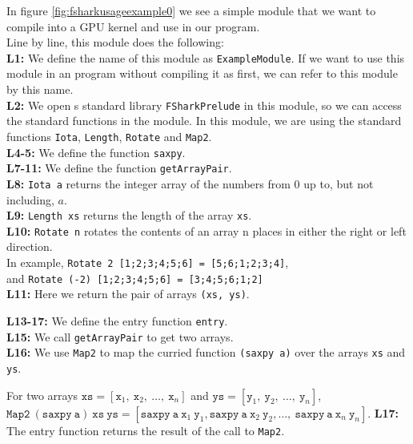 In figure \ref{fig:fsharkusageexample0} we see a simple \fshark{} module that we
want to compile into a GPU kernel and use in our \fsharp{} program.
\\
Line by line, this module does the following:\\
\textbf{L1:} We define the name of this module as \texttt{ExampleModule}. If we
want to use this module in an \fsharp{} program without compiling it as
\fshark{} first, we can refer to this module by this name.
\\
\textbf{L2:} We open \fshark{}s standard library \texttt{FSharkPrelude} in this
module, so we can access the standard functions in the \fshark{} module.
In this module, we are using the standard functions \texttt{Iota}, \texttt{Length}, \texttt{Rotate} and \texttt{Map2}.
\\
\textbf{L4-5:} We define the function \texttt{saxpy}.
\\
\textbf{L7-11:} We define the function \texttt{getArrayPair}.
\\
\textbf{L8:} \texttt{Iota a} returns the integer array of the numbers from $0$
up to, but not including, $a$.
\\
\textbf{L9:} \texttt{Length xs} returns the length of the array \texttt{xs}.
\\
\textbf{L10:} \texttt{Rotate n} rotates the contents of an array n places in
either the right or left direction.\\
In example, \texttt{Rotate 2 [1;2;3;4;5;6] = [5;6;1;2;3;4]},\\
and \texttt{Rotate (-2) [1;2;3;4;5;6] = [3;4;5;6;1;2]}
\\
\textbf{L11:} Here we return the pair of arrays \texttt{(xs, ys)}.

\textbf{L13-17:} We define the entry function \texttt{entry}.\\
\textbf{L15:} We call \texttt{getArrayPair} to get two arrays.\\
\textbf{L16:} We use \texttt{Map2} to map the curried function \texttt{(saxpy
  a)}
over the arrays \texttt{xs} and \texttt{ys}.

For two arrays $\mathtt{xs} =
[\mathtt{x}_1,~\mathtt{x}_2,~\ldots,~\mathtt{x}_n]$ and $\mathtt{ys} =
[\mathtt{y}_1,~\mathtt{y}_2,~\ldots,~\mathtt{y}_n]$,\\
$\mathtt{Map2}~\mathtt{(saxpy~a)}~\mathtt{xs}~\mathtt{ys} = [\mathtt{saxpy~a}~\mathtt{x}_1~\mathtt{y}_1, \mathtt{saxpy~a}~\mathtt{x}_2~\mathtt{y}_2,\ldots,~\mathtt{saxpy~a}~\mathtt{x}_n~\mathtt{y}_n]$.
\textbf{L17:} The entry function returns the result of the call to \texttt{Map2}.

